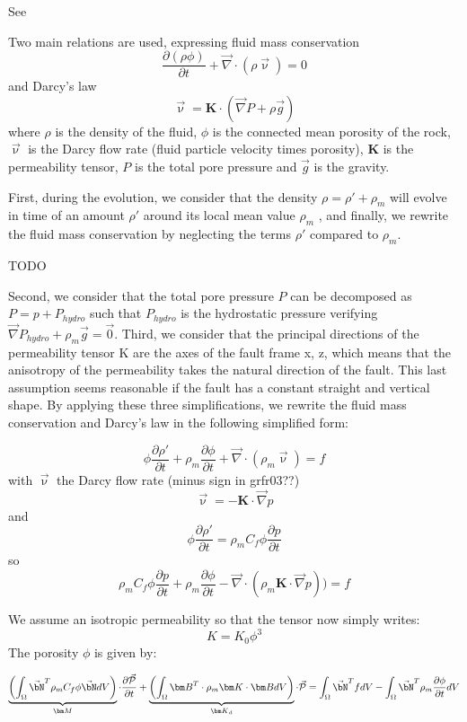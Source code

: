 See \textcite{grfr03}

Two main relations are used, expressing fluid mass conservation
\[
\frac{\partial (\rho \phi)}{\partial t} + \vec\nabla\cdot (\rho \vec{\upnu}) = 0
\]
and Darcy's law
\[
\vec\upnu = {\bm K} \cdot (\vec{\nabla} P + \rho \vec{g})
\]
where $\rho$ is the density of the fluid, $\phi$ is the
connected mean porosity of the rock, $\vec{\upnu}$ is the Darcy flow
rate (fluid particle velocity times porosity), ${\bm K}$ is the
permeability tensor, $P$ is the total pore pressure and $\vec{g}$ is
the gravity.

First, during the evolution, we consider that the density 
$\rho = \rho' + \rho_m$ will evolve in time of an amount $\rho'$ 
around its local mean value $\rho_m$ , and finally, we rewrite the fluid mass
conservation by neglecting the terms $\rho'$ compared to $\rho_m$.

TODO

Second, we consider that the total pore pressure $P$ can
be decomposed as $P = p + P_{hydro}$ such that $P_{hydro}$ is the
hydrostatic pressure verifying $\vec\nabla P_{hydro} + \rho_m \vec{g} = \vec{0}$. Third, we
consider that the principal directions of the permeability
tensor K are the axes of the fault frame x, z, which means
that the anisotropy of the permeability takes the natural
direction of the fault. This last assumption seems reasonable
if the fault has a constant straight and vertical shape. By
applying these three simplifications, we rewrite the fluid
mass conservation and Darcy’s law in the following
simplified form:


\[
\phi \frac{\partial \rho'}{\partial t}
+ \rho_m \frac{\partial \phi}{\partial t} + \vec\nabla \cdot (\rho_m \vec\upnu) = f
\]
with $\vec{\upnu}$ the Darcy flow rate (minus sign in grfr03??)
\[
\vec\upnu = - {\bm K} \cdot \vec{\nabla} p
\]
and
\[
\phi \frac{\partial \rho'}{\partial t}
=
\rho_m C_f  \phi \frac{\partial p}{\partial t}
\]
so 
\[
\rho_m C_f  \phi \frac{\partial p}{\partial t}
+ \rho_m \frac{\partial \phi}{\partial t} 
- \vec\nabla \cdot (\rho_m {\bm K} \cdot \vec{\nabla} p ) ) = f
\]

We assume an isotropic permeability so that the tensor now simply writes:
\[
K = K_0 \phi^3
\]
The porosity $\phi$ is given by:


\[
\underbrace{
\left( \int_\Omega \vec{\bN}^T \rho_m C_f \phi \vec{\bN} dV  \right)
}_{\bm M}
 \cdot \frac{\partial \vec{\cal P}}{\partial t}
+
\underbrace{
\left( \int_\Omega {\bm B}^T \cdot \rho_m {\bm K} \cdot {\bm B} dV \right)
}_{{\bm K}_d}
 \cdot \vec{\cal P}
=
\int_\Omega \vec{\bN}^T f dV 
-
\int_\Omega \vec{\bN}^T   \rho_m \frac{\partial \phi}{\partial t} dV
\]


